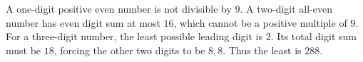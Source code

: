A one-digit positive even number is not divisible by $9$. A two-digit all-even number has even digit sum at most $16$, which cannot be a positive multiple of $9$. For a three-digit number, the least possible leading digit is $2$. Its total digit sum must be $18$, forcing the other two digits to be $8,8$. Thus the least is $\boxed{288}$.
